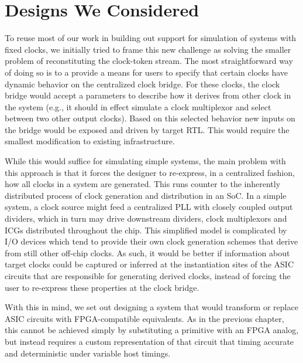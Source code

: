 
\section{Designs We Considered}


To reuse most of our work in building out support for simulation of systems with fixed clocks, we
initially tried to frame this new challenge as solving the smaller
problem of reconstituting the clock-token stream. The most straightforward way
of doing so is to a provide a means for users to specify that certain clocks
have dynamic behavior on the centralized clock bridge. For these clocks, the
clock bridge would accept a parameters to describe how it derives from other
clock in the system (e.g., it should in effect simulate a clock multiplexor and select
between two other output clocks). Based on this selected behavior new inputs on
the bridge would be exposed and driven by target RTL. This would require the
smallest modification to existing infrastructure.

While this would suffice for simulating simple systems, the main problem with this approach is that it forces the
designer to re-express, in a centralized fashion, how all clocks in a system are
generated. This runs counter to the inherently distributed process of clock generation and distribution in an SoC.
In a simple system, a clock source might feed a centralized PLL with closely coupled output dividers,
which in turn may drive downstream dividers, clock multiplexors and
ICGs distributed throughout the chip. This simplified model is complicated by I/O
devices which tend to provide their own clock generation schemes that derive from still other off-chip clocks. 
As such, it would be better if information about target clocks could be
captured or inferred at the instantiation sites of the ASIC circuits that are
responsible for generating derived clocks, instead of forcing the user to
re-express these properties at the clock bridge.

With this in mind, we set out designing a system that would transform or replace
ASIC circuits with FPGA-compatible equivalents. As in the previous chapter,
this cannot be achieved simply by substituting a primitive with an FPGA analog,
but instead requires a custom representation of that circuit that timing
accurate and deterministic under variable host timings.

